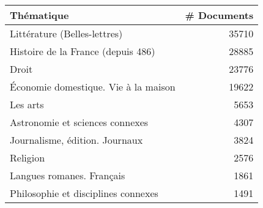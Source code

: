  \begin{tabular}{|p{5cm}|p{3cm}|}%

\hline
\small{\textbf{Thématique}} & \small{\textbf{\# Documents}} \\ %
\hline
  \small{Littérature (Belles-lettres)} & \multicolumn{1}{r|}{35710}  \\
  \small{Histoire de la France (depuis 486)} & \multicolumn{1}{r|}{28885}\\
  \small{Droit} & \multicolumn{1}{r|}{23776}\\
  \small{Économie domestique. Vie à la maison} & \multicolumn{1}{r|}{19622}\\
  \small{Les arts} & \multicolumn{1}{r|}{5653}\\
  \small{Astronomie et sciences connexes} & \multicolumn{1}{r|}{4307}\\
  \small{Journalisme, édition. Journaux} & \multicolumn{1}{r|}{3824}\\
  \small{Religion} & \multicolumn{1}{r|}{2576}\\
  \small{Langues romanes. Français} & \multicolumn{1}{r|}{1861}\\
  \small{Philosophie et disciplines connexes} & \multicolumn{1}{r|}{1491}\\
  \hline
\end{tabular}


